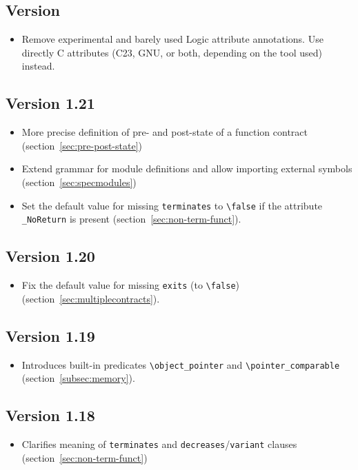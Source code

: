 \subsection{Version \version}
\begin{itemize}
\item Remove experimental and barely used Logic attribute annotations.
Use directly C attributes (C23, GNU, or both, depending on the tool used) instead.
\end{itemize}
\subsection{Version 1.21}
\begin{itemize}
\item More precise definition of pre- and post-state of a function contract
  (section~\ref{sec:pre-post-state})
\item Extend grammar for module definitions and allow importing external symbols
  (section~\ref{sec:specmodules})
\item Set the default value for missing \lstinline|terminates| to
  \lstinline|\false| if the attribute \lstinline|_NoReturn| is present
  (section~\ref{sec:non-term-funct}).
\end{itemize}
\subsection{Version 1.20}
\begin{itemize}
\item Fix the default value for missing \lstinline|exits| (to
\lstinline|\false|) (section~\ref{sec:multiplecontracts}).
\end{itemize}
\subsection{Version 1.19}
\begin{itemize}
\item Introduces built-in predicates \lstinline|\object_pointer| and
\lstinline|\pointer_comparable| (section~\ref{subsec:memory}).
\end{itemize}
\subsection{Version 1.18}
\begin{itemize}
\item Clarifies meaning of \lstinline|terminates| and
  \lstinline|decreases|/\lstinline|variant| clauses (section~\ref{sec:non-term-funct})
\end{itemize}
